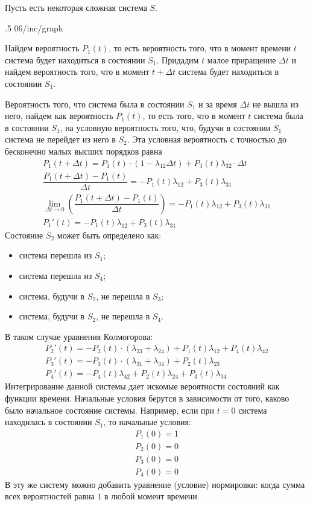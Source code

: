 Пусть есть некоторая сложная система $S$.

\image
{.5\textwidth}
{06/inc/graph}
{}

Найдем вероятность $P_1(t)$, то есть вероятность того, что в момент времени $t$ система будет находиться в состоянии $S_1$. Придадим $t$ малое приращение ${\Delta t}$ и найдем вероятность того, что в момент ${t + \Delta t}$ система будет находиться в состоянии $S_1$.

Вероятность того, что система была в состоянии $S_1$ и за время $\Delta t$ не вышла из него, найдем как вероятность $P_1(t)$, то есть того, что в момент $t$ система была в состоянии $S_1$, на условную вероятность того, что, будучи в состоянии $S_1$ система не перейдет из него в $S_2$. Эта условная вероятность с точностью до бесконечно малых высших порядков равна
%
\begin{gather*}
    P_1(t + \Delta t) = P_1(t)\cdot(1-\lambda_{12}\Delta t) + P_3(t)\lambda_{32}\cdot\Delta t\\
    \dfrac{P_1(t + \Delta t) - P_1(t)}{\Delta t} = -P_1(t)\lambda_{12} + P_3(t)\lambda_{31}\\
    \lim_{\Delta t\rightarrow 0}\left(\dfrac{P_1(t + \Delta t) - P_1(t)}{\Delta t}\right) = -P_1(t)\lambda_{12} + P_3(t)\lambda_{31}\\
    P_1'(t) = -P_1(t)\lambda_{12} + P_3(t)\lambda_{31}
\end{gather*}
%
Состояние $S_2$ может быть определено как:

\begin{itemize}
    \item система перешла из $S_1$;
    \item система перешла из $S_4$;
    \item система, будучи в $S_2$, не перешла в $S_3$;
    \item система, будучи в $S_2$, не перешла в $S_4$.
\end{itemize}

В таком случае уравнения Колмогорова:
%
\begin{gather*}
    P_2'(t) = -P_2(t)\cdot(\lambda_{23} + \lambda_{24}) + P_1(t)\lambda_{12} + P_4(t)\lambda_{42}\\
    P_3'(t) = -P_3(t)\cdot(\lambda_{31} + \lambda_{34}) + P_2(t)\lambda_{23}\\
    P_4'(t) = -P_4(t)\lambda_{42} + P_2(t)\lambda_{24} + P_3(t)\lambda_{34}
\end{gather*}
%
Интегрирование данной системы дает искомые вероятности состояний как функции времени. Начальные условия берутся в зависимости от того, каково было начальное состояние системы. Например, если при ${t = 0}$ система находилась в состоянии $S_1$, то начальные условия:
%
\begin{gather*}
    P_1(0) = 1\\
    P_2(0) = 0\\
    P_3(0) = 0\\
    P_4(0) = 0
\end{gather*}
%
В эту же систему можно добавить уравнение (условие) нормировки: когда сумма всех вероятностей равна $1$ в любой момент времени.

